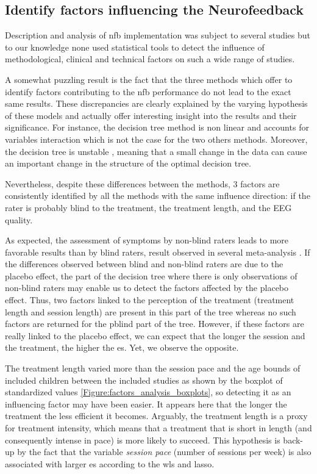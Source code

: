 
\subsection{Identify factors influencing the Neurofeedback}

Description and analysis of \gls{nfb} implementation was subject to several studies \citep{Arns2014, Enriquez2017, Vernon2004, Jeunet2018} 
but to our knowledge none used statistical tools to detect the influence of methodological, clinical and technical factors 
on such a wide range of studies. 

A somewhat puzzling result is the fact that the three methods which offer to identify factors contributing to the \gls{nfb} 
performance do not lead to the exact same results. These discrepancies are clearly explained by the varying hypothesis 
of these models and actually offer interesting insight into the results and their significance. For instance, the decision tree method is non 
linear and accounts for variables interaction which is not the case for the two others methods. Moreover, the decision tree is unstable 
\citep{dwyer2007}, meaning that a small change in the data can cause an important change in the structure of the optimal decision tree.

Nevertheless, despite these differences between the methods, 3 factors are consistently identified by all the methods with 
the same influence direction: if the rater is probably blind to the treatment, the treatment length, and the EEG quality. 

As expected, the assessment of symptoms by non-blind raters leads to more favorable results than by blind raters, 
result observed in several meta-analysis  \citep{Cortese2016, Micoulaud2014}. If the differences observed between blind 
and non-blind raters are due to the placebo effect, the part of the decision tree where there is only observations of 
non-blind raters may enable us to detect the factors affected by the placebo effect. 
Thus, two factors linked to the perception of the treatment (treatment length and session length)
are present in this part of the tree whereas no such factors are returned for 
the \gls{pblind} part of the tree. However, if these factors are really linked to the placebo effect, we can expect that
the longer the session and the treatment, the higher the \gls{es}. Yet, we observe the opposite.

The treatment length varied more than the session pace and the age bounds of included children between the included studies as shown 
by the boxplot of standardized values \cref{Figure:factors_analysis_boxplots}, so detecting it as an influencing factor may have 
been easier. It appears here that the longer the treatment the less efficient it becomes. Arguably, the treatment length is a proxy 
for treatment intensity, which means that a treatment that is short in length (and consequently intense in pace) 
is more likely to succeed. This hypothesis is back-up by the fact that the variable \emph{session pace} (number of sessions per week) 
is also associated with larger \gls{es} according to the \gls{wls} and \gls{lasso}. 

